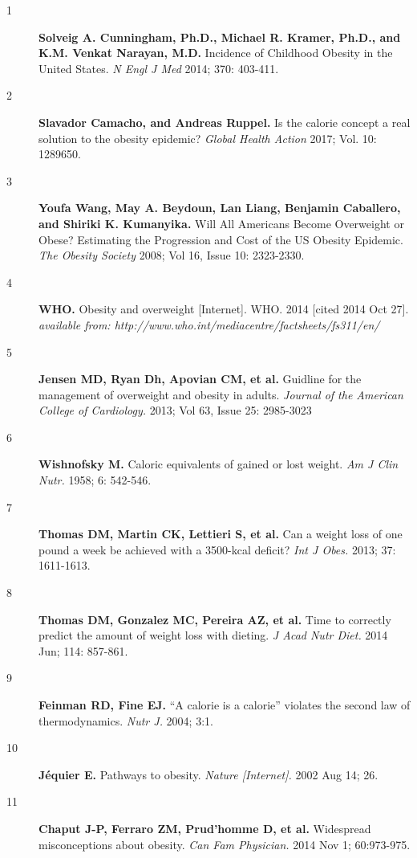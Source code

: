 \documentclass[11pt]{article}  %
\begin{document}
\begin{description}
  \item[1] \textbf{Solveig A. Cunningham, Ph.D., Michael R. Kramer, Ph.D., and K.M. Venkat Narayan, M.D.} Incidence of Childhood Obesity in the United States. \textit{N Engl J Med} 2014; 370: 403-411.
  \item[2] \textbf{Slavador Camacho, and Andreas Ruppel.} Is the calorie concept a real solution to the obesity epidemic? \textit{Global Health Action} 2017; Vol. 10: 1289650.
  \item[3] \textbf{Youfa Wang, May A. Beydoun, Lan Liang, Benjamin Caballero, and Shiriki K. Kumanyika.} Will All Americans Become Overweight or Obese? Estimating the Progression and Cost of the US Obesity Epidemic. \textit{The Obesity Society} 2008; Vol 16, Issue 10: 2323-2330.
  \item[4] \textbf{WHO.} Obesity and overweight [Internet]. WHO. 2014 [cited 2014 Oct 27].\\ \textit{available from: http://www.who.int/mediacentre/factsheets/fs311/en/}
  \item[5] \textbf{Jensen MD, Ryan Dh, Apovian CM, et al.} Guidline for the management of overweight and obesity in adults.  \textit{Journal of the American College of Cardiology.} 2013; Vol 63, Issue 25: 2985-3023
  \item[6] \textbf{Wishnofsky M.} Caloric equivalents of gained or lost weight. \textit{Am J Clin Nutr.} 1958; 6: 542-546.
  \item[7] \textbf{Thomas DM, Martin CK, Lettieri S, et al.} Can a weight loss of one pound a week be achieved with a 3500-kcal deficit? \textit{Int J Obes.} 2013; 37: 1611-1613.
  \item[8] \textbf{Thomas DM, Gonzalez MC, Pereira AZ, et al.} Time to correctly predict the amount of weight loss with dieting. \textit{J Acad Nutr Diet.} 2014 Jun; 114: 857-861.
  \item[9] \textbf{Feinman RD, Fine EJ.} ``A calorie is a calorie'' violates the second law of thermodynamics. \textit{Nutr J.} 2004; 3:1.
  \item[10]\textbf{J\'{e}quier E.} Pathways to obesity. \textit{Nature [Internet].} 2002 Aug 14; 26.
  \item[11]\textbf{Chaput J-P, Ferraro ZM, Prud'homme D, et al.} Widespread misconceptions about obesity. \textit{Can Fam Physician.} 2014 Nov 1; 60:973-975.

\end{description}
\end{document}

